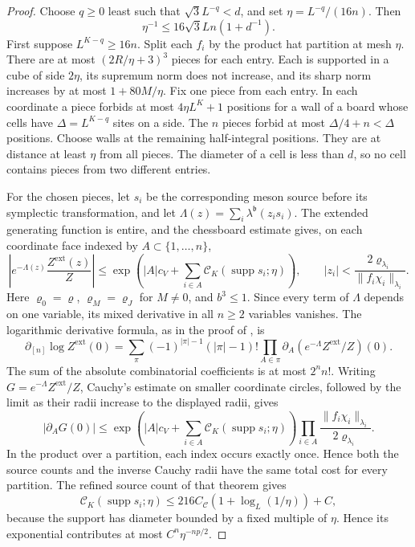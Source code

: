 \documentclass[11pt,letterpaper,reqno]{amsart}
\theoremstyle{definition}
\theoremstyle{remark}
\begin{document}
\begin{proof}
Choose $q\ge0$ least such that $\sqrt3L^{-q}<d$, and set
$\eta=L^{-q}/(16n)$. Then
\[
 \eta^{-1}\le16\sqrt3Ln(1+d^{-1}).
\]
First suppose $L^{K-q}\ge16n$. Split each $f_i$ by the
product hat partition at mesh $\eta$. There are at most
$(2R/\eta+3)^3$ pieces for each entry. Each is supported in
a cube of side $2\eta$, its supremum norm does not increase,
and its sharp norm increases by at most $1+80M/\eta$.
Fix one piece from each entry. In each coordinate a piece
forbids at most $4\eta L^K+1$ positions for a wall of a
board whose cells have $\Delta=L^{K-q}$ sites on a side.
The $n$ pieces forbid at most $\Delta/4+n<\Delta$
positions. Choose walls at the remaining half-integral
positions. They are at distance at least $\eta$ from all
pieces. The diameter of a cell is less than $d$, so no
cell contains pieces from two different entries.

For the chosen pieces, let $s_i$ be the corresponding meson
source before its symplectic transformation, and let
$\Lambda(z)=\sum_i\lambda^{\mathfrak b}(z_is_i)$.
The extended generating function is entire, and the
chessboard estimate gives, on each coordinate face indexed
by $A\subset\{1,\ldots,n\}$,
\[
 \left|e^{-\Lambda(z)}\frac{Z^{\mathrm{ext}}(z)}{Z}\right|
 \le\exp\left(|A|c_V+
       \sum_{i\in A}\mathscr C_K(\operatorname{supp}s_i;\eta)\right),
  \qquad |z_i|<\frac{2\varrho_{\lambda_i}}{
                                      \|f_i\chi_i\|_{\lambda_i}}.
\]
Here $\varrho_0=\varrho$, $\varrho_M=\varrho_J$ for $M\ne0$,
and $b^3\le1$. Since every term of $\Lambda$ depends on
one variable, its mixed derivative in all $n\ge2$ variables
vanishes. The logarithmic derivative formula, as in the proof
of \cite[Thm. F]{QCDM1}, is
\[
 \partial_{[n]}\log Z^{\mathrm{ext}}(0)
 =\sum_\pi(-1)^{|\pi|-1}(|\pi|-1)!
       \prod_{A\in\pi}\partial_A
           \left(e^{-\Lambda}Z^{\mathrm{ext}}/Z\right)(0).
\]
The sum of the absolute combinatorial coefficients is at
most $2^nn!$. Writing $G=e^{-\Lambda}Z^{\mathrm{ext}}/Z$,
Cauchy's estimate on smaller coordinate circles, followed by
the limit as their radii increase to the displayed radii, gives
\[
 |\partial_AG(0)|\le
 \exp\left(|A|c_V+
       \sum_{i\in A}\mathscr C_K(\operatorname{supp}s_i;\eta)\right)
 \prod_{i\in A}\frac{\|f_i\chi_i\|_{\lambda_i}}
                            {2\varrho_{\lambda_i}}.
\]
In the product over a partition, each index occurs exactly
once. Hence both the source counts and the inverse Cauchy
radii have the same total cost for every partition.
The refined source count of that theorem gives
\[
 \mathscr C_K(\operatorname{supp}s_i;\eta)
    \le216C_{\mathscr C}(1+\log_L(1/\eta))+C,
\]
because the support has diameter bounded by a fixed
multiple of $\eta$. Hence its exponential contributes
at most $C^n\eta^{-np/2}$.


\end{proof}
\end{document}
